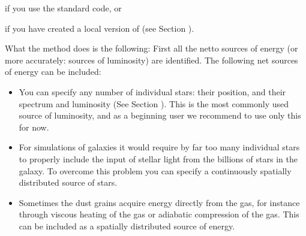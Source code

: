 \documentclass[letterpaper,10pt,english]{sphinxmanual}
\begin{document}
\begin{sphinxVerbatim}[commandchars=\\\{\}]
 
\end{sphinxVerbatim}

if you use the standard  code, or

\begin{sphinxVerbatim}[commandchars=\\\{\}]
 
\end{sphinxVerbatim}

if you have created a local version of  (see Section
{\hyperref[\detokenize{installation:sec-special-purpose-compile}]{}}).

What the method does is the following: First all the netto sources of energy
(or more accurately: sources of luminosity) are identified. The following
net sources of energy can be included:
\begin{itemize}
\item {} 
 You can specify any number of individual stars: their
position, and their spectrum and luminosity (See Section
{\hyperref[\detokenize{inputoutputfiles:sec-stars}]{}}). This is the most commonly used source of luminosity, and
as a beginning user we recommend to use only this for now.

\item {} 
 For simulations of galaxies it would
require by far too many individual stars to properly include the input
of stellar light from the billions of stars in the galaxy. To overcome
this problem you can specify a continuously spatially distributed source
of stars. 

\item {} 
 Sometimes the dust grains
acquire energy directly from the gas, for instance through viscous heating
of the gas or adiabatic compression of the gas. This can be included as a
spatially distributed source of energy. 

\end{itemize}
\end{document}
